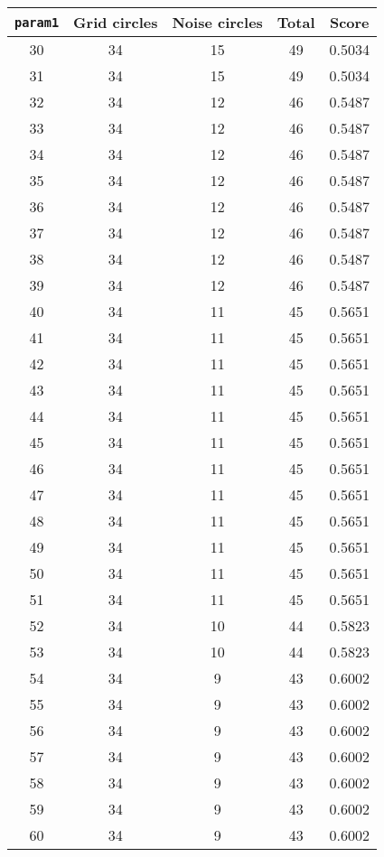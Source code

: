 \documentclass[letterpaper, 12pt]{article}
\begin{document}
\begin{longtable}{|c|c|c|c|c|}
\hline
\textbf{\texttt{param1}} & \textbf{Grid circles} & \textbf{Noise circles} & \textbf{Total} & \textbf{Score} \\
\hline
30 & 34 & 15 & 49 & 0.5034 \\
\hline
31 & 34 & 15 & 49 & 0.5034 \\
\hline
32 & 34 & 12 & 46 & 0.5487 \\
\hline
33 & 34 & 12 & 46 & 0.5487 \\
\hline
34 & 34 & 12 & 46 & 0.5487 \\
\hline
35 & 34 & 12 & 46 & 0.5487 \\
\hline
36 & 34 & 12 & 46 & 0.5487 \\
\hline
37 & 34 & 12 & 46 & 0.5487 \\
\hline
38 & 34 & 12 & 46 & 0.5487 \\
\hline
39 & 34 & 12 & 46 & 0.5487 \\
\hline
40 & 34 & 11 & 45 & 0.5651 \\
\hline
41 & 34 & 11 & 45 & 0.5651 \\
\hline
42 & 34 & 11 & 45 & 0.5651 \\
\hline
43 & 34 & 11 & 45 & 0.5651 \\
\hline
44 & 34 & 11 & 45 & 0.5651 \\
\hline
45 & 34 & 11 & 45 & 0.5651 \\
\hline
46 & 34 & 11 & 45 & 0.5651 \\
\hline
47 & 34 & 11 & 45 & 0.5651 \\
\hline
48 & 34 & 11 & 45 & 0.5651 \\
\hline
49 & 34 & 11 & 45 & 0.5651 \\
\hline
50 & 34 & 11 & 45 & 0.5651 \\
\hline
51 & 34 & 11 & 45 & 0.5651 \\
\hline
52 & 34 & 10 & 44 & 0.5823 \\
\hline
53 & 34 & 10 & 44 & 0.5823 \\
\hline
54 & 34 & 9 & 43 & 0.6002 \\
\hline
55 & 34 & 9 & 43 & 0.6002 \\
\hline
56 & 34 & 9 & 43 & 0.6002 \\
\hline
57 & 34 & 9 & 43 & 0.6002 \\
\hline
58 & 34 & 9 & 43 & 0.6002 \\
\hline
59 & 34 & 9 & 43 & 0.6002 \\
\hline
60 & 34 & 9 & 43 & 0.6002 \\

\end{longtable}
\end{document}
